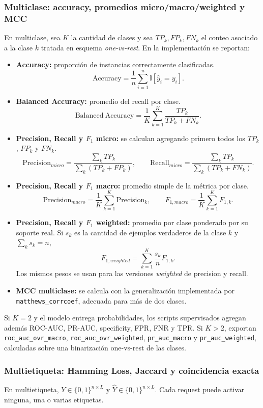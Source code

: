 \documentclass[12pt,oneside]{report}
\newcommand{\ind}{\mathbb{I}} %
\begin{document}
\subsubsection{Multiclase: accuracy, promedios micro/macro/weighted y MCC}
En multiclase, sea $K$ la cantidad de clases y sea $TP_k,FP_k,FN_k$ el conteo asociado a la clase $k$ tratada en esquema \emph{one-vs-rest}. En la implementación se reportan:
\begin{itemize}[leftmargin=*]
  \item \textbf{Accuracy:} proporción de instancias correctamente clasificadas.
  \[
  \mathrm{Accuracy}=\frac{1}{n}\sum_{i=1}^{n}\ind[\hat y_i=y_i].
  \]
  \item \textbf{Balanced Accuracy:} promedio del recall por clase.
  \[
  \mathrm{Balanced\ Accuracy}=\frac{1}{K}\sum_{k=1}^{K}\frac{TP_k}{TP_k+FN_k}.
  \]
  \item \textbf{Precision, Recall y $F_1$ micro:} se calculan agregando primero todos los $TP_k$, $FP_k$ y $FN_k$.
  \[
  \mathrm{Precision}_{micro}=\frac{\sum_k TP_k}{\sum_k(TP_k+FP_k)},\qquad
  \mathrm{Recall}_{micro}=\frac{\sum_k TP_k}{\sum_k(TP_k+FN_k)}.
  \]
  \item \textbf{Precision, Recall y $F_1$ macro:} promedio simple de la métrica por clase.
  \[
  \mathrm{Precision}_{macro}=\frac{1}{K}\sum_{k=1}^{K}\mathrm{Precision}_k,
  \qquad
  F_{1,macro}=\frac{1}{K}\sum_{k=1}^{K}F_{1,k}.
  \]
  \item \textbf{Precision, Recall y $F_1$ weighted:} promedio por clase ponderado por su soporte real.
  Si $s_k$ es la cantidad de ejemplos verdaderos de la clase $k$ y $\sum_k s_k=n$,
  \[
  F_{1,weighted}=\sum_{k=1}^{K}\frac{s_k}{n}F_{1,k}.
  \]
  Los mismos pesos se usan para las versiones \textit{weighted} de precision y recall.
  \item \textbf{MCC multiclase:} se calcula con la generalización implementada por \texttt{matthews\_corrcoef}, adecuada para más de dos clases.
\end{itemize}

Si $K=2$ y el modelo entrega probabilidades, los scripts supervisados agregan además ROC-AUC, PR-AUC, specificity, FPR, FNR y TPR. Si $K>2$, exportan \texttt{roc\_auc\_ovr\_macro}, \texttt{roc\_auc\_ovr\_weighted}, \texttt{pr\_auc\_macro} y \texttt{pr\_auc\_weighted}, calculadas sobre una binarización one-vs-rest de las clases.

\subsubsection{Multietiqueta: Hamming Loss, Jaccard y coincidencia exacta}
En multietiqueta, $Y\in\{0,1\}^{n\times L}$ y $\hat{Y}\in\{0,1\}^{n\times L}$. Cada request puede activar ninguna, una o varias etiquetas.
\end{document}

